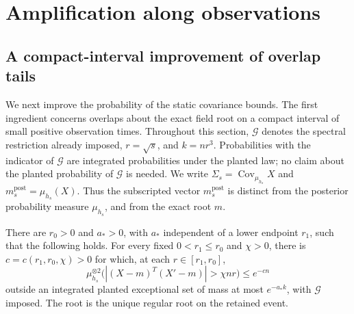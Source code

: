 \section{Amplification along observations}
\label{prof:amplification}

\subsection{A compact-interval improvement of overlap tails}
\label{prof:sec-bridge}

We next improve the probability of the static covariance bounds.  The first
ingredient concerns overlaps about the exact field root on a compact interval
of small positive observation times.  Throughout this section,
\(\mathcal G\) denotes the spectral restriction already imposed,
\(r=\sqrt s\), and \(k=nr^3\).  Probabilities with the indicator of
\(\mathcal G\) are integrated probabilities under the planted law; no claim
about the planted probability of \(\mathcal G\) is needed.  We write
\(\Sigma_s=\operatorname{Cov}_{\mu_{h_s}}X\) and
\(m_s^{\mathrm{post}}=\mu_{h_s}(X)\).  Thus the subscripted vector
\(m_s^{\mathrm{post}}\) is distinct from the posterior probability measure
\(\mu_{h_s}\), and from the exact root \(m\).

\begin{lemma}
\label{prof:lem-compact-bridge}
There are \(r_0>0\) and \(a_*>0\), with \(a_*\) independent of a lower
endpoint \(r_1\), such that the following holds.  For every fixed
\(0<r_1\le r_0\) and \(\chi>0\), there is \(c=c(r_1,r_0,\chi)>0\)
for which, at each \(r\in[r_1,r_0]\),
\[
 \mu_{h_s}^{\otimes2}
 \bigl( |(X-m)^T(X'-m)|>\chi nr\bigr)\le e^{-cn}
\]
outside an integrated planted exceptional set of mass at most
\(e^{-a_*k}\), with \(\mathcal G\) imposed.  The root is the unique
regular root on the retained event.
\end{lemma}

